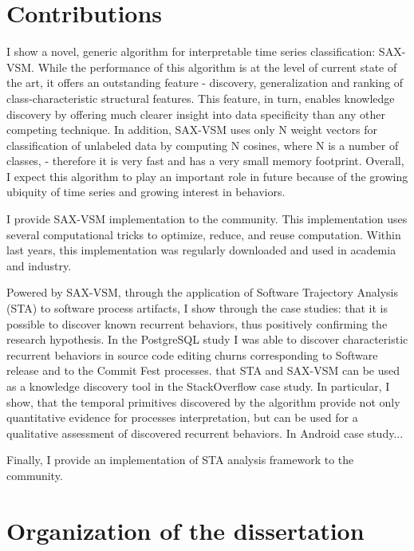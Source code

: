 \section{Contributions}
I show a novel, generic algorithm for interpretable time series classification: SAX-VSM. 
While the performance of this algorithm is at the level of current state of the art, it offers an outstanding feature -
discovery, generalization and ranking of class-characteristic structural features. This feature, in turn, enables
knowledge discovery by offering much clearer insight into data specificity than any other competing technique.
In addition, SAX-VSM uses only N weight vectors for classification of unlabeled data by computing N cosines, where N is
a number of classes, - therefore it is very fast and has a very small memory footprint.
Overall, I expect this algorithm to play an important role in future because of the growing ubiquity of time series and
growing interest in behaviors.

I provide SAX-VSM implementation to the community. This implementation uses several computational tricks to optimize,
reduce, and reuse computation. Within last years, this implementation was regularly downloaded and used in academia and
industry. 

Powered by SAX-VSM, through the application of Software Trajectory Analysis (STA) to software process artifacts, I show
through the case studies: that it is possible to discover known recurrent behaviors, thus positively confirming the
research hypothesis. In the PostgreSQL study I was able to discover characteristic recurrent behaviors in source code
editing churns corresponding
to Software release and to the Commit Fest processes.
that STA and SAX-VSM can be used as a knowledge discovery tool in the StackOverflow case study. In particular, I show,
that the temporal primitives discovered by the algorithm provide not only quantitative evidence for processes
interpretation, but can be used for a qualitative assessment of discovered recurrent behaviors.
In Android case study...

Finally, I provide an implementation of STA analysis framework to the community. 

\section{Organization of the dissertation}